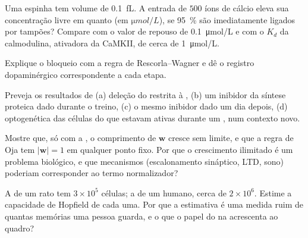 \begin{exercise}[$\star\star$]\label{exo:b3:learning-memory:7}
Uma espinha tem volume de \qty{0.1}{fL}. A entrada de $500$ íons de
cálcio eleva sua concentração livre em quanto (em
$\unit{\micro mol/L}$), se \qty{95}{\%} são imediatamente ligados por
tampões? Compare com o valor de repouso de \qty{0.1}{\micro mol/L} e com
o $K_{d}$ da calmodulina, ativadora da CaMKII, de cerca de
\qty{1}{\micro mol/L}.
\end{exercise}

\begin{exercise}[$\star\star$]\label{exo:b3:learning-memory:8}
Explique o bloqueio com a regra de Rescorla--Wagner e dê o registro
dopaminérgico correspondente a cada etapa.
\end{exercise}

\begin{exercise}[$\star\star$]\label{exo:b3:learning-memory:9}
Preveja os resultados de (a) deleção do  restrita à ,
(b) um inibidor da síntese proteica dado durante o treino, (c) o mesmo
inibidor dado um dia depois, (d)  optogenética das células do
 que estavam ativas durante um , num
contexto novo.
\end{exercise}

\begin{exercise}[$\star\star\star$]\label{exo:b3:learning-memory:10}
Mostre que, só com a , o comprimento de $\mathbf{w}$ cresce
sem limite, e que a regra de Oja tem $|\mathbf{w}| = 1$ em qualquer ponto
fixo. Por que o crescimento ilimitado é um problema biológico, e que
mecanismos (escalonamento sináptico, LTD, sono) poderiam corresponder ao
termo normalizador?
\end{exercise}

\begin{exercise}[$\star\star\star$]\label{exo:b3:learning-memory:11}
A  de um rato tem $3\times 10^{5}$ células; a de um humano, cerca de
$2\times 10^{6}$. Estime a capacidade de Hopfield de cada uma. Por que a
estimativa é uma medida ruim de quantas memórias uma pessoa guarda, e o
que o papel do  na  acrescenta ao quadro?
\end{exercise}

